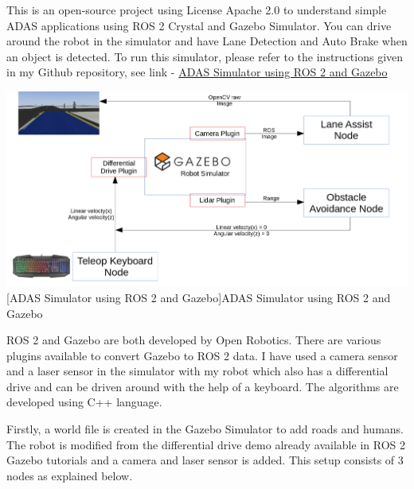 \documentclass[%
xelatex,
	oneside,		%
	12pt,			%
	parskip=half,	%
	abstracton,
	chapterprefix=true%
    appendixprefix=true]
{scrbook}
\begin{document}
\rofoot[\pagemark]{\pagemark}
This is an open-source project using License Apache 2.0 to understand simple ADAS applications using ROS 2 Crystal and Gazebo Simulator. You can drive around the robot in the simulator and have Lane Detection and Auto Brake when an object is detected. To run this simulator, please refer to the instructions given in my Github repository, see link - \href{https://github.com/Viplav04/ADAS-ROS2-Gazebo-Simulator}{ADAS Simulator using ROS 2 and Gazebo}\cite{ADASsim}
	\begin{center}
\includegraphics[scale=0.26]{fig/ros2adas.png}
[ADAS Simulator using ROS 2 and Gazebo]{ADAS Simulator using ROS 2 and Gazebo}
\label{fig:ADAS}

\end{center}

ROS 2 and Gazebo are both developed by Open Robotics. There are various plugins available to convert Gazebo to ROS 2 data. I have used a camera sensor and a laser sensor in the simulator with my robot which also has a differential drive and can be driven around with the help of a keyboard. The algorithms are developed using C++ language.

Firstly, a world file is created in the Gazebo Simulator to add roads and humans. The robot is modified from the differential drive demo already available in ROS 2 Gazebo tutorials and a camera and laser sensor is added. This setup consists of 3 nodes as explained below.
\end{document}

